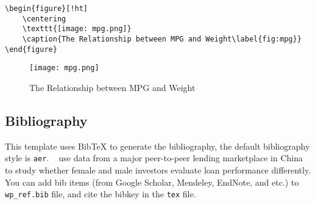 \documentclass{elegantpaper}
\begin{document}
\begin{Verbatim}[tabsize=4,frame=single,baselinestretch=1]
\begin{figure}[!ht]
	\centering
	\texttt{[image: mpg.png]}
	\caption{The Relationship between MPG and Weight\label{fig:mpg}}
\end{figure}
\end{Verbatim}
\begin{figure}[!ht]
	\centering
	\texttt{[image: mpg.png]}
	\caption{The Relationship between MPG and Weight\label{fig:mpg}}
\end{figure}

\subsection{Bibliography}
This template uses Bib\TeX{} to generate the bibliography, the default bibliography style is \verb|aer|. ~\cite{Chen2018} use data from a major peer-to-peer lending marketplace in China to study whether female and male investors evaluate loan performance differently. You can add bib items (from Google Scholar, Mendeley, EndNote, and etc.) to \verb|wp_ref.bib| file, and cite the bibkey in the \verb|tex| file.


\nocite{EINAV2010,Havrylchyk2018}



\end{document}
